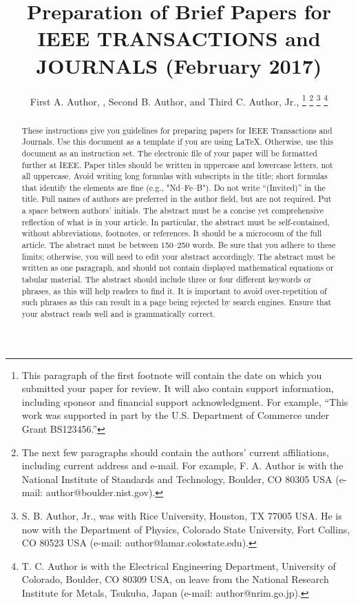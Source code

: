 \documentclass[twoside,web]{ieeecolor}
\begin{document}
\title{Preparation of Brief Papers for IEEE TRANSACTIONS and JOURNALS (February 2017)}
\author{First A. Author, , Second B. Author, and Third C. Author, Jr., 
\thanks{This paragraph of the first footnote will contain the date on 
which you submitted your paper for review. It will also contain support 
information, including sponsor and financial support acknowledgment. For 
example, ``This work was supported in part by the U.S. Department of 
Commerce under Grant BS123456.'' }
\thanks{The next few paragraphs should contain 
the authors' current affiliations, including current address and e-mail. For 
example, F. A. Author is with the National Institute of Standards and 
Technology, Boulder, CO 80305 USA (e-mail: author@boulder.nist.gov). }
\thanks{S. B. Author, Jr., was with Rice University, Houston, TX 77005 USA. He is 
now with the Department of Physics, Colorado State University, Fort Collins, 
CO 80523 USA (e-mail: author@lamar.colostate.edu).}
\thanks{T. C. Author is with 
the Electrical Engineering Department, University of Colorado, Boulder, CO 
80309 USA, on leave from the National Research Institute for Metals, 
Tsukuba, Japan (e-mail: author@nrim.go.jp).}}

\maketitle

\begin{abstract}
These instructions give you guidelines for preparing papers for 
IEEE Transactions and Journals. Use this document as a template if you are 
using \LaTeX. Otherwise, use this document as an 
instruction set. The electronic file of your paper will be formatted further 
at IEEE. Paper titles should be written in uppercase and lowercase letters, 
not all uppercase. Avoid writing long formulas with subscripts in the title; 
short formulas that identify the elements are fine (e.g., "Nd--Fe--B"). Do 
not write ``(Invited)'' in the title. Full names of authors are preferred in 
the author field, but are not required. Put a space between authors' 
initials. The abstract must be a concise yet comprehensive reflection of 
what is in your article. In particular, the abstract must be self-contained, 
without abbreviations, footnotes, or references. It should be a microcosm of 
the full article. The abstract must be between 150--250 words. Be sure that 
you adhere to these limits; otherwise, you will need to edit your abstract 
accordingly. The abstract must be written as one paragraph, and should not 
contain displayed mathematical equations or tabular material. The abstract 
should include three or four different keywords or phrases, as this will 
help readers to find it. It is important to avoid over-repetition of such 
phrases as this can result in a page being rejected by search engines. 
Ensure that your abstract reads well and is grammatically correct.
\end{abstract}
\end{document}
